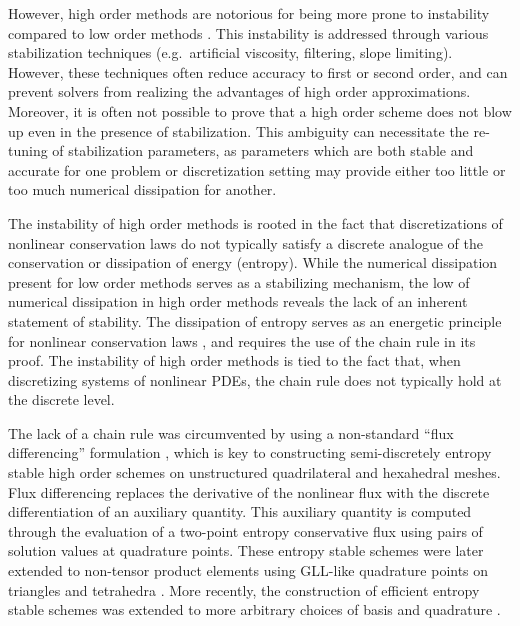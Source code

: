 \documentclass[review,onefignum,onetabnum,final]{siamart171218}
\begin{document}
However, high order methods are notorious for being more prone to instability compared to low order methods \cite{wang2013high}.  This instability is addressed through various stabilization techniques (e.g.\ artificial viscosity, filtering, slope limiting).  However, these techniques often reduce accuracy to first or second order, and can prevent solvers from realizing the advantages of high order approximations.  Moreover, it is often not possible to prove that a high order scheme does not blow up even in the presence of stabilization.  This ambiguity can necessitate the re-tuning of stabilization parameters, as parameters which are both stable and accurate for one problem or discretization setting  may provide either too little or too much numerical dissipation for another.  

The instability of high order methods is rooted in the fact that discretizations of nonlinear conservation laws do not typically satisfy a discrete analogue of the conservation or dissipation of energy (entropy).  While the numerical dissipation present for low order methods serves as a stabilizing mechanism, the low of numerical dissipation in high order methods reveals the lack of an inherent statement of stability.  The dissipation of entropy serves as an energetic principle for nonlinear conservation laws \cite{dafermos2005compensated}, and requires the use of the chain rule in its proof.  The instability of high order methods is tied to the fact that, when discretizing systems of nonlinear PDEs, the chain rule does not typically hold at the discrete level.  

The lack of a chain rule was circumvented by using a non-standard ``flux differencing'' formulation \cite{fisher2013high, carpenter2014entropy, gassner2016split, gassner2017br1}, which is key to constructing semi-discretely entropy stable high order schemes on unstructured quadrilateral and hexahedral meshes.  Flux differencing replaces the derivative of the nonlinear flux with the discrete differentiation of an auxiliary quantity.  This auxiliary quantity is computed through the evaluation of a two-point entropy conservative flux \cite{tadmor1987numerical} using pairs of solution values at quadrature points.  These entropy stable schemes were later extended to non-tensor product elements using GLL-like quadrature points on triangles and tetrahedra \cite{chen2017entropy, crean2018entropy}.  More recently, the construction of efficient entropy stable schemes was extended to more arbitrary choices of basis and quadrature \cite{chan2017discretely, chan2018discretely}.  
\end{document}
